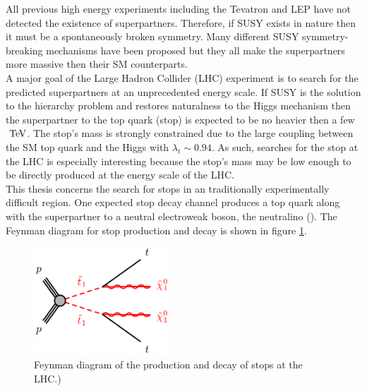 \indent All previous high energy experiments including the Tevatron and LEP have not detected the existence of superpartners.  Therefore, if SUSY exists in nature then it must be a spontaneously broken symmetry.  Many different SUSY symmetry-breaking mechanisms have been proposed but they all make the superpartners more massive then their SM counterparts. \\

\indent A major goal of the Large Hadron Collider (LHC) experiment is to search for the predicted superpartners at an unprecedented energy scale.  If SUSY is the solution to the hierarchy problem and restores naturalness to the Higgs mechanism then the superpartner to the top quark (stop) is expected to be no heavier then a few $\tev$.  The stop's mass is strongly constrained due to the large coupling between the SM top quark and the Higgs with $\lambda_t \sim 0.94$.  As such, searches for the stop at the LHC is especially interesting because the stop's mass may be low enough to be directly produced at the energy scale of the LHC. \\

\indent This thesis concerns the search for stops in an traditionally experimentally difficult region.  One expected stop decay channel produces a top quark along with the superpartner to a neutral electroweak boson, the neutralino (\ninoone).  The Feynman diagram for stop production and decay is shown in figure \ref{fig:stopprod}. \\

\begin{figure}[h!]
\centering
    \includegraphics[width=0.45\textwidth]{figures/feynDiag/stst-tN1tN1.png}\hspace{0.05\textwidth}
\caption{ Feynman diagram of the production and decay of stops at the LHC.)}
\label{fig:stopprod}
\end{figure}

